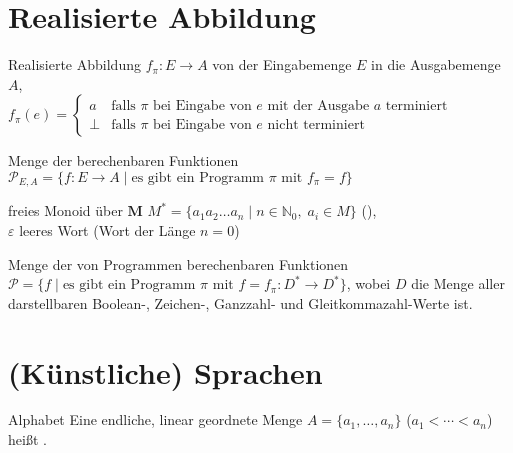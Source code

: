 \section{%
    Realisierte Abbildung%
}

\begin{Def}{Realisierte Abbildung} $f_\pi: E \rightarrow A$ von der
    Eingabemenge $E$ in die Ausgabemenge $A$, \\
    $f_\pi(e) =
    \begin{cases}
        a & \text{falls } \pi \text{ bei Eingabe von } e
        \text{ mit der Ausgabe } a \text{ terminiert} \\
        \bot & \text{falls } \pi \text{ bei Eingabe von } e
        \text{ nicht terminiert}
    \end{cases}$
\end{Def}

\begin{Def}{Menge der berechenbaren Funktionen}\\
    $\mathcal{P}_{E,A} = \{f: E \rightarrow A \;|\; \text{es gibt ein
    Programm } \pi \text{ mit } f_\pi = f\}$
\end{Def}

\begin{Def}{freies Monoid über $\boldsymbol{M}$}
    $M^\ast = \{a_1 a_2 \ldots a_n \;|\;
    n \in \mathbb{N}_0,\; a_i \in M\}$ (), \\
    $\varepsilon$ leeres Wort (Wort der Länge $n=0$)
\end{Def}

\begin{Def}{Menge der von Programmen berechenbaren Funktionen}\\
    $\mathcal{P} = \{f \;|\; \text{es gibt ein Programm } \pi \text{ mit }
    f = f_\pi: D^\ast \rightarrow D^\ast\}$, wobei
    $D$ die Menge aller darstellbaren Boolean-, Zeichen-, Ganzzahl- und
    Gleitkommazahl-Werte ist.
\end{Def}

\section{%
    (Künstliche) Sprachen%
}

\begin{Def}{Alphabet}
    Eine endliche, linear geordnete Menge $A = \{a_1, \ldots, a_n\}$ \quad
    ($a_1 < \cdots < a_n$) heißt .
\end{Def}

